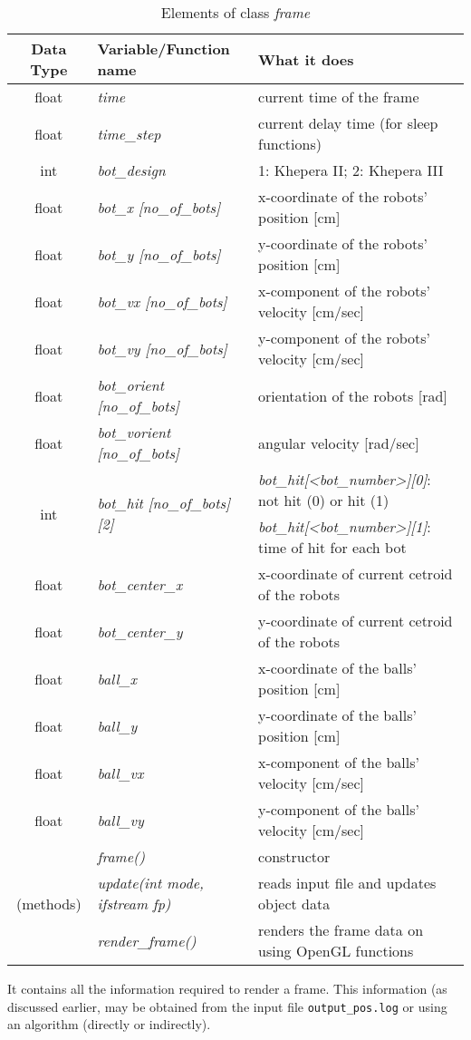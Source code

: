 \documentclass[10pt,a4paper]{article}
\begin{document}
\begin{table}[ht]
\centering
\begin{tabular}{|c|l|l|} \hline
Data Type & Variable/Function name			& What it does \\
\hline
float	& {\it time}						& current time of the frame \\
float	& {\it time\_step}					& current delay time (for sleep functions) \\
\hline
int		& {\it bot\_design}					& 1: Khepera II; 2: Khepera III \\
float	& {\it bot\_x		[no\_of\_bots]}	& x-coordinate of the robots' position [cm] \\
float	& {\it bot\_y		[no\_of\_bots]}	& y-coordinate of the robots' position [cm] \\
float	& {\it bot\_vx		[no\_of\_bots]}	& x-component of the robots' velocity [cm/sec] \\
float	& {\it bot\_vy		[no\_of\_bots]}	& y-component of the robots' velocity [cm/sec] \\
float	& {\it bot\_orient	[no\_of\_bots]}	& orientation of the robots [rad] \\
float	& {\it bot\_vorient	[no\_of\_bots]}	& angular velocity [rad/sec] \\
\multirow{2}{*}{int} & \multirow{2}{*}{{\it bot\_hit [no\_of\_bots][2]}} & {\it bot\_hit[\textless bot\_number\textgreater ][0]}\/: not hit (0) or hit (1) \\ 
	& &	{\it bot\_hit[\textless bot\_number\textgreater ][1]}\/: time of hit for each bot \\

float	& {\it bot\_center\_x}				& x-coordinate of current cetroid of the robots \\
float	& {\it bot\_center\_y}				& y-coordinate of current cetroid of the robots \\
\hline
float	& {\it ball\_x}						& x-coordinate of the balls' position [cm] \\
float	& {\it ball\_y}						& y-coordinate of the balls' position [cm] \\
float	& {\it ball\_vx}					& x-component of the balls' velocity [cm/sec] \\
float	& {\it ball\_vy}					& y-component of the balls' velocity [cm/sec] \\
\hline
\multirow{3}{*}{(methods)} & {\it frame()}	& constructor \\
 & {\it update(int mode, ifstream fp)}		& reads input file and updates object data \\
 & {\it render\_frame()}					& renders the frame data on using OpenGL functions \\
\hline
\end{tabular}
\caption{\sf Elements of class {\it frame}}
\label{classelem}
\end{table}
It contains all the information required to render a frame. This information (as discussed earlier, may be obtained from the input file {\tt output\_pos.log} or using an algorithm (directly or indirectly).
\end{document}
